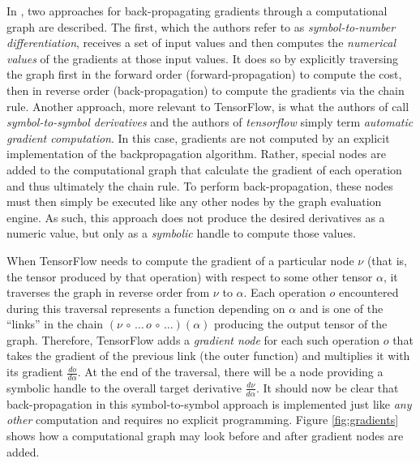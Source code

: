 In \cite{goodfellow2016}, two approaches for back-propagating gradients through
a computational graph are described. The first, which the authors refer to as
\emph{symbol-to-number differentiation}, receives a set of input values and then
computes the \emph{numerical values} of the gradients at those input values. It
does so by explicitly traversing the graph first in the forward order
(forward-propagation) to compute the cost, then in reverse order
(back-propagation) to compute the gradients via the chain rule. Another
approach, more relevant to TensorFlow, is what the authors of
\cite{goodfellow2016} call \emph{symbol-to-symbol derivatives} and the authors
of \emph{tensorflow} simply term \emph{automatic gradient computation}. In this
case, gradients are not computed by an explicit implementation of the
backpropagation algorithm. Rather, special nodes are added to the computational
graph that calculate the gradient of each operation and thus ultimately the
chain rule. To perform back-propagation, these nodes must then simply be
executed like any other nodes by the graph evaluation engine. As such, this
approach does not produce the desired derivatives as a numeric value, but only
as a \emph{symbolic} handle to compute those values.

When TensorFlow needs to compute the gradient of a particular node $\nu$ (that
is, the tensor produced by that operation) with respect to some other tensor
$\alpha$, it traverses the graph in reverse order from $\nu$ to $\alpha$. Each
operation $o$ encountered during this traversal represents a function depending
on $\alpha$ and is one of the ``links'' in the chain
$(\nu \,\circ\, \dots\, o \,\circ\, \dots)(\alpha)$ producing the output tensor
of the graph. Therefore, TensorFlow adds a \emph{gradient node} for each such
operation $o$ that takes the gradient of the previous link (the outer function)
and multiplies it with its gradient $\frac{do}{d\alpha}$. At the end of the
traversal, there will be a node providing a symbolic handle to the overall
target derivative $\frac{d\nu}{d\alpha}$. It should now be clear that
back-propagation in this symbol-to-symbol approach is implemented just like
\emph{any other} computation and requires no explicit programming. Figure
\ref{fig:gradients} shows how a computational graph may look before and after
gradient nodes are added.

